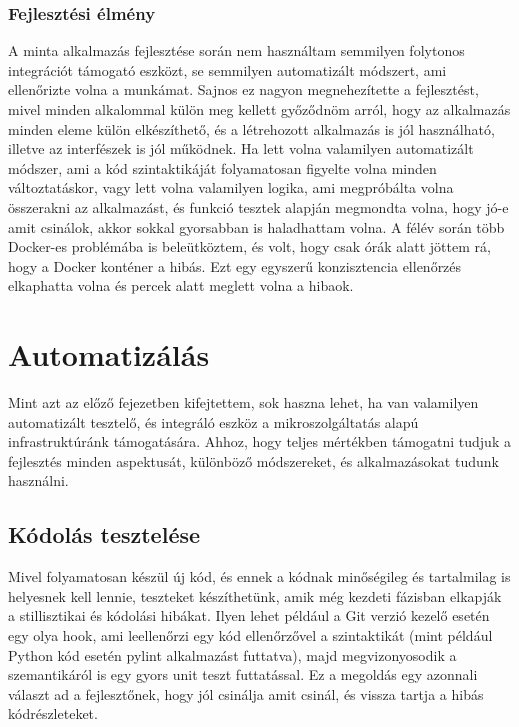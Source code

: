 \documentclass[11pt,magyar,a4paper,twoside,]{report}
\begin{document}
\subsubsection{Fejlesztési élmény}\label{fejlesztuxe9si-uxe9lmuxe9ny}

A minta alkalmazás fejlesztése során nem használtam semmilyen folytonos
integrációt támogató eszközt, se semmilyen automatizált módszert, ami
ellenőrizte volna a munkámat. Sajnos ez nagyon megnehezítette a
fejlesztést, mivel minden alkalommal külön meg kellett győződnöm arról,
hogy az alkalmazás minden eleme külön elkészíthető, és a létrehozott
alkalmazás is jól használható, illetve az interfészek is jól működnek.
Ha lett volna valamilyen automatizált módszer, ami a kód szintaktikáját
folyamatosan figyelte volna minden változtatáskor, vagy lett volna
valamilyen logika, ami megpróbálta volna összerakni az alkalmazást, és
funkció tesztek alapján megmondta volna, hogy jó-e amit csinálok, akkor
sokkal gyorsabban is haladhattam volna. A félév során több Docker-es
problémába is beleütköztem, és volt, hogy csak órák alatt jöttem rá,
hogy a Docker konténer a hibás. Ezt egy egyszerű konzisztencia
ellenőrzés elkaphatta volna és percek alatt meglett volna a hibaok.

\section{Automatizálás}\label{automatizuxe1luxe1s}

Mint azt az előző fejezetben kifejtettem, sok haszna lehet, ha van
valamilyen automatizált tesztelő, és integráló eszköz a
mikroszolgáltatás alapú infrastruktúránk támogatására. Ahhoz, hogy
teljes mértékben támogatni tudjuk a fejlesztés minden aspektusát,
különböző módszereket, és alkalmazásokat tudunk használni.

\subsection{Kódolás tesztelése}\label{kuxf3doluxe1s-teszteluxe9se}

Mivel folyamatosan készül új kód, és ennek a kódnak minőségileg és
tartalmilag is helyesnek kell lennie, teszteket készíthetünk, amik még
kezdeti fázisban elkapják a stillisztikai és kódolási hibákat. Ilyen
lehet például a Git verzió kezelő esetén egy olya hook, ami leellenőrzi
egy kód ellenőrzővel a szintaktikát (mint például Python kód esetén
pylint alkalmazást futtatva), majd megvizonyosodik a szemantikáról is
egy gyors unit teszt futtatással. Ez a megoldás egy azonnali választ ad
a fejlesztőnek, hogy jól csinálja amit csinál, és vissza tartja a hibás
kódrészleteket.
\end{document}
